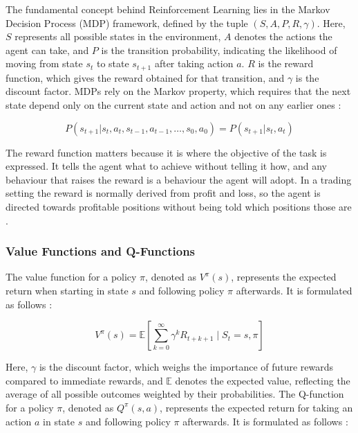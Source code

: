 The fundamental concept behind Reinforcement Learning lies in the Markov Decision Process (MDP) framework, defined by the tuple \( (S, A, P, R, \gamma) \). Here, \( S \) represents all possible states in the environment, \( A \) denotes the actions the agent can take, and \( P \) is the transition probability, indicating the likelihood of moving from state \( s_t \) to state \( s_{t+1} \) after taking action \( a \). \( R \) is the reward function, which gives the reward obtained for that transition, and \( \gamma \) is the discount factor. MDPs rely on the Markov property, which requires that the next state depend only on the current state and action and not on any earlier ones \cite{sutton_reinforcement_2018}:

\begin{equation}
\label{Equation:MarkovProperty}
P(s_{t+1} | s_t, a_t, s_{t-1}, a_{t-1}, \ldots, s_0, a_0) = P(s_{t+1} | s_t, a_t)
\end{equation}

The reward function matters because it is where the objective of the task is expressed. It tells the agent what to achieve without telling it how, and any behaviour that raises the reward is a behaviour the agent will adopt. In a trading setting the reward is normally derived from profit and loss, so the agent is directed towards profitable positions without being told which positions those are \cite{sutton_reinforcement_2018}.

\subsubsection{Value Functions and Q-Functions}

The value function for a policy \( \pi \), denoted as \( V^\pi(s) \), represents the expected return when starting in state \( s \) and following policy \( \pi \) afterwards. It is formulated as follows \cite{sutton_reinforcement_2018}:

\begin{equation}
V^\pi(s) = \mathbb{E} \left[ \sum_{k=0}^{\infty} \gamma^k R_{t+k+1} \mid S_t = s, \pi \right]
\end{equation}

Here, \( \gamma \) is the discount factor, which weighs the importance of future rewards compared to immediate rewards, and \( \mathbb{E} \) denotes the expected value, reflecting the average of all possible outcomes weighted by their probabilities. The Q-function for a policy \( \pi \), denoted as \( Q^\pi(s, a) \), represents the expected return for taking an action \( a \) in state \( s \) and following policy \( \pi \) afterwards. It is formulated as follows \cite{sutton_reinforcement_2018}:

